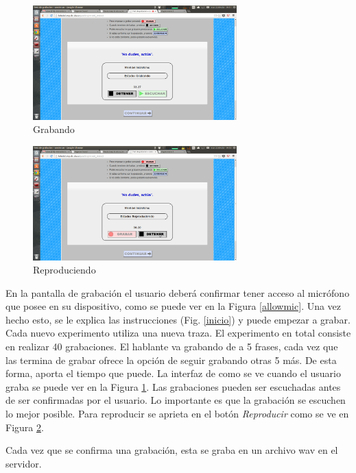 \documentclass[11pt,a4paper,twoside]{tesis}
\begin{document}
\begin{figure}[h!]
    \centerline{\includegraphics[width=0.7\textwidth]{pag-grabar1} }
    \caption{Grabando}
    \label{grabando}
\end{figure}

\begin{figure}[h!]
    \centerline{\includegraphics[width=0.7\textwidth]{pag-play1} }
    \caption{Reproduciendo}
    \label{reproduciendo}
\end{figure}

En la pantalla de grabación el usuario deberá confirmar tener acceso al micrófono que posee en su dispositivo, como se puede ver en la Figura \ref{allowmic}.  Una vez hecho esto, se le explica las instrucciones (Fig. \ref{inicio}) y puede empezar a grabar. Cada nuevo experimento utiliza una nueva traza. El experimento en total consiste en realizar 40 grabaciones. El hablante va grabando de a 5 frases, cada vez que las termina de grabar ofrece la opción de seguir grabando otras 5 más. De esta forma, aporta el tiempo que puede. La interfaz de como se ve cuando el usuario graba se puede ver en la Figura \ref{grabando}. Las grabaciones pueden ser escuchadas antes de ser confirmadas por el usuario. Lo importante es que la grabación se escuchen lo mejor posible. Para reproducir se aprieta en el botón \textit{Reproducir} como se ve en Figura \ref{reproduciendo}.

Cada vez que se confirma una grabación, esta se graba en un archivo wav en el servidor. 
\end{document}
